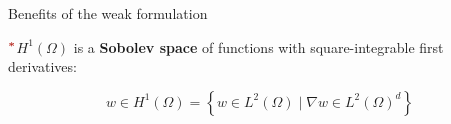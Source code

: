 \documentclass[10pt,externalviewer]{beamer}
\begin{document}
\begin{frame}{Benefits of the weak formulation}
   

   \vspace{-0.5cm}


   \vspace{0.6cm}

   $^{\boldsymbol{\textcolor{BrickRed}{\ast}}}$\scriptsize{$H^1(\Omega)$ is a \textbf{Sobolev space} of functions with square-integrable first derivatives:}

   \begin{equation*}
      w\in H^1(\Omega)=\left\{w\in L^2(\Omega)\mid\nabla w\in L^2(\Omega)^d\right\}
   \end{equation*}

   \normalsize
\end{frame}
\end{document}
